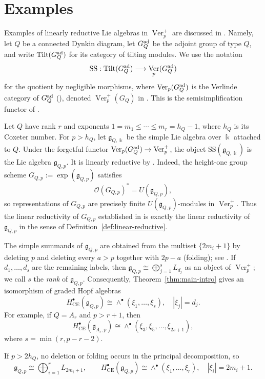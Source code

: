\documentclass[12pt]{amsart}
\theoremstyle{remark}
\DeclareMathOperator{\Ver}{Ver}
\newcommand{\kk}{\Bbbk}
\newcommand{\g}{\mathfrak g}
\newcommand{\CE}{\mathrm{CE}}
\begin{document}
\section{Examples}\label{sec:examples}

Examples of linearly reductive Lie algebras in $\Ver_p^+$
are discussed in \cite[Section~4]{CEO24}. Namely, 
let $Q$ be a connected Dynkin
diagram, let $G_Q^{\rm ad}$ be the adjoint group of type $Q$, and write
$\operatorname{Tilt}(G_Q^{\rm ad})$ for its category of tilting modules.  We
use the notation
\[
 \mathrm{SS}:\operatorname{Tilt}(G_Q^{\rm ad})
 \longrightarrow \Ver_p(G_Q^{\rm ad})
\]
for the quotient by negligible morphisms, where $\Ver_p(G_Q^{\rm ad})$ 
is the Verlinde category of $G_Q^{\rm ad}$ (\cite[Section~6]{EO22}), denoted
$\Ver_p^+(G_Q)$ in \cite[Section~4.1]{CEO24}.  This is the semisimplification
functor of \cite[Definition~2.5 and Theorem~2.6]{EO22}.

Let $Q$ have rank $r$ and exponents
$1=m_1\leq\cdots\leq m_r=h_Q-1$, where $h_Q$ is its Coxeter number.  For
$p>h_Q$, let $\g_{Q,\kk}$ be the simple Lie algebra over $\kk$ attached to
$Q$.  Under the forgetful functor
$\Ver_p(G_Q^{\rm ad})\to\Ver_p^+$, the object
$\mathrm{SS}(\g_{Q,\kk})$ is the Lie algebra $\g_{Q,p}$.  It is linearly
reductive by \cite[Section~4]{CEO24}.  Indeed, the height-one group scheme
$G_{Q,p}:=\exp(\g_{Q,p})$ satisfies
\[
 \mathcal O(G_{Q,p})^*=U(\g_{Q,p}),
\]
so representations of $G_{Q,p}$ are precisely finite
$U(\g_{Q,p})$-modules in $\Ver_p^+$.  Thus the linear reductivity of
$G_{Q,p}$ established in \cite[Section~4]{CEO24} is exactly the linear
reductivity of $\g_{Q,p}$ in the sense of
Definition~\ref{def:linear-reductive}.
 
The simple summands of $\g_{Q,p}$ are obtained from the multiset $\{2m_i+1\}$ by deleting $p$
and deleting every $a>p$ together with $2p-a$ (folding); see
\cite[Subsection~4.2]{CEO24}.  If $d_1,\dots,d_s$ are the remaining labels,
then
$\g_{Q,p}\cong\bigoplus_{j=1}^sL_{d_j}$ as an object of $\Ver_p^+$; we call $s$ the {\it rank} of $\g_{Q,p}$. 
Consequently, Theorem~\ref{thm:main-intro} gives an isomorphism of graded Hopf algebras
 $$
 H^\bullet_{\CE}(\g_{Q,p})
 \cong\wedge^\bullet(\xi_1,\dots,\xi_s),
 \quad |\xi_j|=d_j.
$$
For example, if $Q=A_r$ and $p>r+1$, then
$$
 H^\bullet_{\CE}(\g_{A_r,p})
 \cong\wedge^\bullet(\xi_3,\xi_5,\dots,\xi_{2s+1}),
$$
where $s=\min(r,p-r-2)$.

If $p>2h_Q$, no deletion or folding occurs in the principal decomposition,
so
\begin{equation}\label{eq:stable-verlinde}
 \g_{Q,p}\cong\bigoplus_{i=1}^rL_{2m_i+1},
 \qquad
 H^\bullet_{\CE}(\g_{Q,p})
 \cong\wedge^\bullet(\xi_1,\dots,\xi_r),
 \quad |\xi_i|=2m_i+1.
\end{equation}
\end{document}
